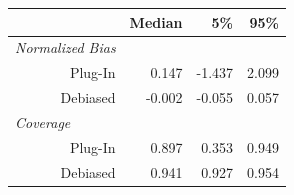 
\begin{tabular}{r|rrr}
\toprule
  & Median & 5\% & 95\%\\
\midrule
\multicolumn{1}{l|}{\textit{Normalized Bias}}\\
Plug-In & 0.147 & -1.437 & 2.099\\
Debiased & -0.002 & -0.055 & 0.057\\
\midrule
\multicolumn{1}{l|}{\textit{Coverage}}\\
Plug-In & 0.897 & 0.353 & 0.949\\
Debiased & 0.941 & 0.927 & 0.954\\
\bottomrule
\end{tabular}
